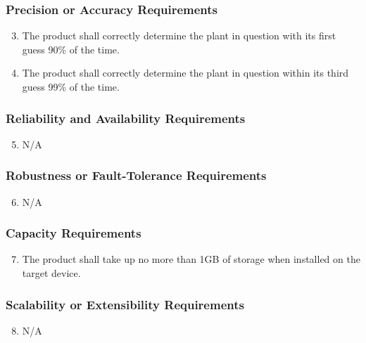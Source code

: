 \documentclass[]{article}
\begin{document}
\subsubsection{Precision or Accuracy Requirements}
\label{ssub:precision_or_accuracy_requirements}
\begin{enumerate}[{PR}1.]
	\setcounter{enumi}{2}
	\item The product shall correctly determine the plant in question with its first guess 90\% of the time.
	\item The product shall correctly determine the plant in question within its third guess 99\% of the time.
\end{enumerate}

\subsubsection{Reliability and Availability Requirements}
\label{ssub:reliability_and_availability_requirements}
\begin{enumerate}[{PR}1.]
	\setcounter{enumi}{4}
	\item {\color{red}N/A}
\end{enumerate}

\subsubsection{Robustness or Fault-Tolerance Requirements}
\label{ssub:robustness_or_fault_tolerance_requirements}
\begin{enumerate}[{PR}1.]
	\setcounter{enumi}{5}
	\item N/A
\end{enumerate}

\subsubsection{Capacity Requirements}
\label{ssub:capacity_requirements}
\begin{enumerate}[{PR}1.]
	\setcounter{enumi}{6}
	\item The product shall take up no more than 1GB of storage when installed on the target device.
\end{enumerate}

\subsubsection{Scalability or Extensibility Requirements}
\label{ssub:scalability_or_extensibility_requirements}
\begin{enumerate}[{PR}1.]
	\setcounter{enumi}{7}
	\item N/A
\end{enumerate}
\end{document}
